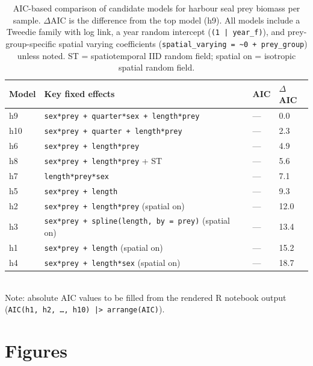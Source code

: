 \begin{table}[htp]
  \centering
  \caption{AIC-based comparison of candidate models for harbour seal prey
    biomass per sample. $\Delta$AIC is the difference from the top model
    (h9). All models include a Tweedie family with log link, a year random
    intercept (\texttt{(1 | year\_f)}), and prey-group-specific spatial
    varying coefficients (\texttt{spatial\_varying = \textasciitilde 0 +
    prey\_group}) unless noted. ST = spatiotemporal IID random field;
    spatial on = isotropic spatial random field.}
  \renewcommand\arraystretch{2}
  \label{tab:AIC}
  \begin{tabular}{L{1cm} L{7.5cm} R{2cm} R{2cm}}
    \toprule
    \textbf{Model} & \textbf{Key fixed effects} & \textbf{AIC} & \textbf{$\Delta$AIC} \\
    \midrule
    h9  & \texttt{sex*prey + quarter*sex + length*prey}              & ---  & 0.0  \\
    h10 & \texttt{sex*prey + quarter + length*prey}                  & ---  & 2.3  \\
    h6  & \texttt{sex*prey + length*prey}                            & ---  & 4.9  \\
    h8  & \texttt{sex*prey + length*prey} + ST                       & ---  & 5.6  \\
    h7  & \texttt{length*prey*sex}                                   & ---  & 7.1  \\
    h5  & \texttt{sex*prey + length}                                 & ---  & 9.3  \\
    h2  & \texttt{sex*prey + length*prey} (spatial on)               & ---  & 12.0 \\
    h3  & \texttt{sex*prey + spline(length, by = prey)} (spatial on) & ---  & 13.4 \\
    h1  & \texttt{sex*prey + length} (spatial on)                    & ---  & 15.2 \\
    h4  & \texttt{sex*prey + length*sex} (spatial on)                & ---  & 18.7 \\
    \bottomrule
  \end{tabular}
  \medskip\\
  \small Note: absolute AIC values to be filled from the rendered R notebook
  output (\texttt{AIC(h1, h2, \ldots, h10) |> arrange(AIC)}).
\end{table}

\clearpage

\section{Figures}

